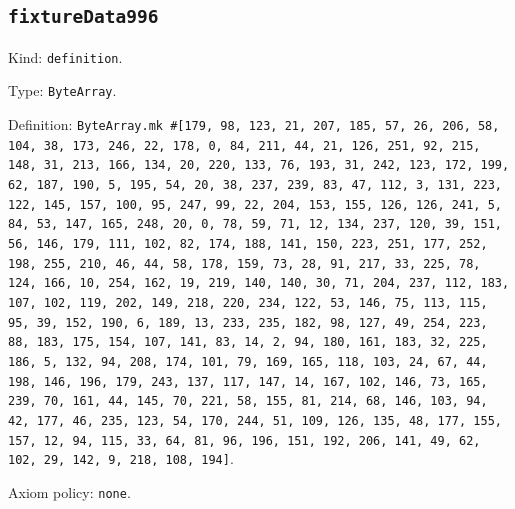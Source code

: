 \documentclass[11pt]{article}
\begin{document}
\subsection*{\texttt{fixtureData996}}
\noindent Kind: \texttt{definition}.\par
\noindent Type: \texttt{ByteArray}.\par
\noindent Definition: \texttt{ByteArray.mk \#[179, 98, 123, 21, 207, 185, 57, 26, 206, 58, 104, 38, 173, 246, 22, 178, 0, 84, 211, 44, 21, 126, 251, 92, 215, 148, 31, 213, 166, 134, 20, 220, 133, 76, 193, 31, 242, 123, 172, 199, 62, 187, 190, 5, 195, 54, 20, 38, 237, 239, 83, 47, 112, 3, 131, 223, 122, 145, 157, 100, 95, 247, 99, 22, 204, 153, 155, 126, 126, 241, 5, 84, 53, 147, 165, 248, 20, 0, 78, 59, 71, 12, 134, 237, 120, 39, 151, 56, 146, 179, 111, 102, 82, 174, 188, 141, 150, 223, 251, 177, 252, 198, 255, 210, 46, 44, 58, 178, 159, 73, 28, 91, 217, 33, 225, 78, 124, 166, 10, 254, 162, 19, 219, 140, 140, 30, 71, 204, 237, 112, 183, 107, 102, 119, 202, 149, 218, 220, 234, 122, 53, 146, 75, 113, 115, 95, 39, 152, 190, 6, 189, 13, 233, 235, 182, 98, 127, 49, 254, 223, 88, 183, 175, 154, 107, 141, 83, 14, 2, 94, 180, 161, 183, 32, 225, 186, 5, 132, 94, 208, 174, 101, 79, 169, 165, 118, 103, 24, 67, 44, 198, 146, 196, 179, 243, 137, 117, 147, 14, 167, 102, 146, 73, 165, 239, 70, 161, 44, 145, 70, 221, 58, 155, 81, 214, 68, 146, 103, 94, 42, 177, 46, 235, 123, 54, 170, 244, 51, 109, 126, 135, 48, 177, 155, 157, 12, 94, 115, 33, 64, 81, 96, 196, 151, 192, 206, 141, 49, 62, 102, 29, 142, 9, 218, 108, 194]}.\par
\noindent Axiom policy: \texttt{none}.\par
\end{document}
